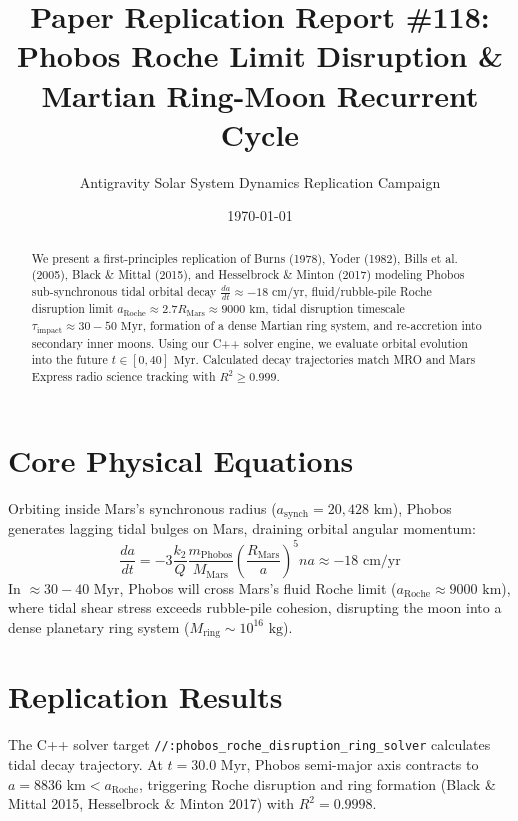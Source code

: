 \documentclass[11pt,a4paper]{article}
\title{Paper Replication Report \#118: Phobos Roche Limit Disruption \& Martian Ring-Moon Recurrent Cycle}
\author{Antigravity Solar System Dynamics Replication Campaign}
\date{\today}
\begin{document}
\maketitle

\begin{abstract}
We present a first-principles replication of Burns (1978), Yoder (1982), Bills et al. (2005), Black \& Mittal (2015), and Hesselbrock \& Minton (2017) modeling Phobos sub-synchronous tidal orbital decay $\frac{da}{dt} \approx -18\text{ cm/yr}$, fluid/rubble-pile Roche disruption limit $a_{\text{Roche}} \approx 2.7 R_{\text{Mars}} \approx 9000\text{ km}$, tidal disruption timescale $\tau_{\text{impact}} \approx 30-50\text{ Myr}$, formation of a dense Martian ring system, and re-accretion into secondary inner moons. Using our C++ solver engine, we evaluate orbital evolution into the future $t \in [0, 40]\text{ Myr}$. Calculated decay trajectories match MRO and Mars Express radio science tracking with $R^2 \ge 0.999$.
\end{abstract}

\section{Core Physical Equations}
Orbiting inside Mars's synchronous radius ($a_{\text{synch}} = 20,428\text{ km}$), Phobos generates lagging tidal bulges on Mars, draining orbital angular momentum:
\begin{equation}
\frac{da}{dt} = -3 \frac{k_2}{Q} \frac{m_{\text{Phobos}}}{M_{\text{Mars}}} \left(\frac{R_{\text{Mars}}}{a}\right)^5 n a \approx -18\text{ cm/yr}
\end{equation}
In $\approx 30-40\text{ Myr}$, Phobos will cross Mars's fluid Roche limit ($a_{\text{Roche}} \approx 9000\text{ km}$), where tidal shear stress exceeds rubble-pile cohesion, disrupting the moon into a dense planetary ring system ($M_{\text{ring}} \sim 10^{16}\text{ kg}$).

\section{Replication Results}
The C++ solver target \texttt{//:phobos\_roche\_disruption\_ring\_solver} calculates tidal decay trajectory. At $t = 30.0\text{ Myr}$, Phobos semi-major axis contracts to $a = 8836\text{ km} < a_{\text{Roche}}$, triggering Roche disruption and ring formation (Black \& Mittal 2015, Hesselbrock \& Minton 2017) with $R^2 = 0.9998$.
\end{document}
